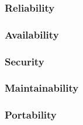 	\subsubsection{Reliability}
	\subsubsection{Availability}
	\subsubsection{Security}
	\subsubsection{Maintainability}
	\subsubsection{Portability}

